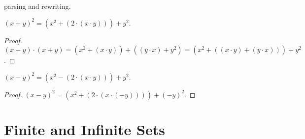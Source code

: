 \documentclass{article}
\begin{document}
parsing and rewriting.
%
\begin{forthel}
\begin{lemma}
$(x + y)^{2} = (x^{2} + (2 \cdot (x \cdot y))) + y^{2}$.
\end{lemma}
\begin{proof}
$(x + y) \cdot (x + y) =
(x^{2} + (x \cdot y)) + ((y \cdot x) + y^{2}) = 
(x^{2} + ((x \cdot y) + (y \cdot x))) + y^{2}$.
\end{proof}

\begin{lemma}
$(x - y)^{2} = (x^{2} - (2 \cdot (x \cdot y))) + y^{2}$.
\end{lemma}
\begin{proof}
$(x - y)^{2} = (x^{2} + (2 \cdot (x \cdot (-y)))) + (-y)^{2}$.
\end{proof}

\end{forthel}

\section{Finite and Infinite Sets}
\end{document}
